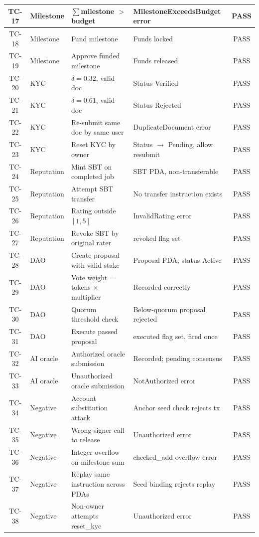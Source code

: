 \begin{table}[H]
\begin{tabular}{|c|l|p{4.0cm}|p{4.3cm}|c|}
TC-17 & Milestone & $\sum$milestone $>$ budget & MilestoneExceedsBudget error & PASS \\ \hline
TC-18 & Milestone & Fund milestone & Funds locked & PASS \\ \hline
TC-19 & Milestone & Approve funded milestone & Funds released & PASS \\ \hline
TC-20 & KYC & $\delta = 0.32$, valid doc & Status Verified & PASS \\ \hline
TC-21 & KYC & $\delta = 0.61$, valid doc & Status Rejected & PASS \\ \hline
TC-22 & KYC & Re-submit same doc by same user & DuplicateDocument error & PASS \\ \hline
TC-23 & KYC & Reset KYC by owner & Status $\to$ Pending, allow resubmit & PASS \\ \hline
TC-24 & Reputation & Mint SBT on completed job & SBT PDA, non-transferable & PASS \\ \hline
TC-25 & Reputation & Attempt SBT transfer & No transfer instruction exists & PASS \\ \hline
TC-26 & Reputation & Rating outside $[1, 5]$ & InvalidRating error & PASS \\ \hline
TC-27 & Reputation & Revoke SBT by original rater & revoked flag set & PASS \\ \hline
TC-28 & DAO & Create proposal with valid stake & Proposal PDA, status Active & PASS \\ \hline
TC-29 & DAO & Vote weight = tokens $\times$ multiplier & Recorded correctly & PASS \\ \hline
TC-30 & DAO & Quorum threshold check & Below-quorum proposal rejected & PASS \\ \hline
TC-31 & DAO & Execute passed proposal & executed flag set, fired once & PASS \\ \hline
TC-32 & AI oracle & Authorized oracle submission & Recorded; pending consensus & PASS \\ \hline
TC-33 & AI oracle & Unauthorized oracle submission & NotAuthorized error & PASS \\ \hline
TC-34 & Negative & Account substitution attack & Anchor seed check rejects tx & PASS \\ \hline
TC-35 & Negative & Wrong-signer call to release & Unauthorized error & PASS \\ \hline
TC-36 & Negative & Integer overflow on milestone sum & checked\_add overflow error & PASS \\ \hline
TC-37 & Negative & Replay same instruction across PDAs & Seed binding rejects replay & PASS \\ \hline
TC-38 & Negative & Non-owner attempts reset\_kyc & Unauthorized error & PASS \\ \hline
\end{tabular}
\end{table}
